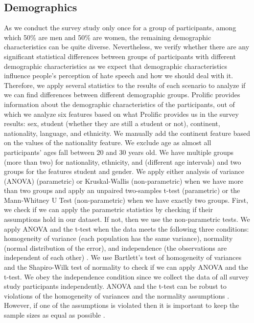 \subsection{Demographics}
\label{sec:analysis-demographic}
As we conduct the survey study only once for a group of participants, among which 50\% are men and 50\% are women, the remaining demographic characteristics can be quite diverse.
%
Nevertheless, we verify whether there are any significant statistical differences between groups of participants with different demographic characteristics as we expect that demographic characteristics influence people's perception of hate speech and how we should deal with it.
%
Therefore, we apply several statistics to the results of each scenario to analyze if we can find differences between different demographic groups.
%
Prolific provides information about the demographic characteristics of the participants, out of which we analyze six features based on what Prolific provides us in the survey results: sex, student (whether they are still a student or not), continent, nationality, language, and ethnicity.
%
We manually add the continent feature based on the values of the nationality feature.
%
We exclude age as almost all participants' ages fall between 20 and 30 years old.
%
We have multiple groups (more than two) for nationality, ethnicity, and  (different age intervals) and two groups for the features student and gender.
%
We apply either analysis of variance (ANOVA) (parametric) or Kruskal-Wallis (non-parametric) when we have more than two groups and apply an unpaired two-samples t-test (parametric) or the Mann-Whitney U Test (non-parametric) when we have exactly two groups.
%
First, we check if we can apply the parametric statistics by checking if their assumptions hold in our dataset.
%
If not, then we use the non-parametric tests.
%
We apply ANOVA and the t-test when the data meets the following three conditions: homogeneity of variance (each population has the same variance), normality (normal distribution of the error), and independence (the observations are independent of each other) \citep{howell2012statistical}.
%
We use Bartlett's test of homogeneity of variances and the Shapiro-Wilk test of normality to check if we can apply ANOVA and the t-test.
%
We obey the independence condition since we collect the data of all survey study participants independently.
%
ANOVA and the t-test can be robust to violations of the homogeneity of variances and the normality assumptions \citep{howell2012statistical}.
%
However, if one of the assumptions is violated then it is important to keep the sample sizes as equal as possible \citep{howell2012statistical}.
